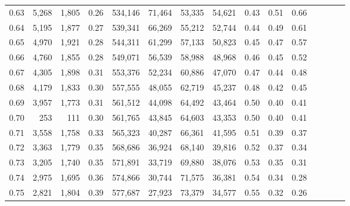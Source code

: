 \begin{tabular}{rrrcrrrrrrrrrrr}
0.63 &   5,268 &  1,805 &                                       0.26 &  534,146 &   71,464 &   53,335 &   54,621 &  0.43 &  0.51 &                         0.66 \\
0.64 &   5,195 &  1,877 &                                       0.27 &  539,341 &   66,269 &   55,212 &   52,744 &  0.44 &  0.49 &                         0.61 \\
0.65 &   4,970 &  1,921 &                                       0.28 &  544,311 &   61,299 &   57,133 &   50,823 &  0.45 &  0.47 &                         0.57 \\
0.66 &   4,760 &  1,855 &                                       0.28 &  549,071 &   56,539 &   58,988 &   48,968 &  0.46 &  0.45 &                         0.52 \\
0.67 &   4,305 &  1,898 &                                       0.31 &  553,376 &   52,234 &   60,886 &   47,070 &  0.47 &  0.44 &                         0.48 \\
0.68 &   4,179 &  1,833 &                                       0.30 &  557,555 &   48,055 &   62,719 &   45,237 &  0.48 &  0.42 &                         0.45 \\
0.69 &   3,957 &  1,773 &                                       0.31 &  561,512 &   44,098 &   64,492 &   43,464 &  0.50 &  0.40 &                         0.41 \\
0.70 &     253 &    111 &                                       0.30 &  561,765 &   43,845 &   64,603 &   43,353 &  0.50 &  0.40 &                         0.41 \\
0.71 &   3,558 &  1,758 &                                       0.33 &  565,323 &   40,287 &   66,361 &   41,595 &  0.51 &  0.39 &                         0.37 \\
0.72 &   3,363 &  1,779 &                                       0.35 &  568,686 &   36,924 &   68,140 &   39,816 &  0.52 &  0.37 &                         0.34 \\
0.73 &   3,205 &  1,740 &                                       0.35 &  571,891 &   33,719 &   69,880 &   38,076 &  0.53 &  0.35 &                         0.31 \\
0.74 &   2,975 &  1,695 &                                       0.36 &  574,866 &   30,744 &   71,575 &   36,381 &  0.54 &  0.34 &                         0.28 \\
0.75 &   2,821 &  1,804 &                                       0.39 &  577,687 &   27,923 &   73,379 &   34,577 &  0.55 &  0.32 &                         0.26 \\

\end{tabular}
